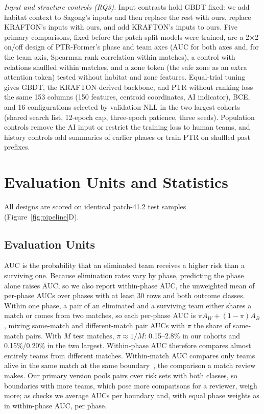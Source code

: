 \documentclass[sigconf,anonymous,nonacm]{acmart}
\begin{document}
\emph{Input and structure controls (RQ3).} Input contrasts hold GBDT fixed: we add habitat context to Sagong's inputs and then replace the rest with ours, replace KRAFTON's inputs with ours, and add KRAFTON's inputs to ours. Five primary comparisons, fixed before the patch-split models were trained, are a 2$\times$2 on/off design of PTR-Former's phase and team axes (AUC for both axes and, for the team axis, Spearman rank correlation within matches), a control with relations shuffled within matches, and a zone token (the safe zone as an extra attention token) tested without habitat and zone features. Equal-trial tuning~\cite{Bergstra12,Cawley10} gives GBDT, the KRAFTON-derived backbone, and PTR without ranking loss the same 153 columns (150 features, centroid coordinates, AI indicator), BCE, and 16 configurations selected by validation NLL in the two largest cohorts (shared search list, 12-epoch cap, three-epoch patience, three seeds). Population controls remove the AI input or restrict the training loss to human teams, and history controls add summaries of earlier phases or train PTR on shuffled past prefixes.

\section{Evaluation Units and Statistics}
\label{sec:method:evaluation}
All designs are scored on identical patch-41.2 test samples (Figure~\ref{fig:pipeline}D).

\subsection{Evaluation Units}
\label{sec:method:units}
AUC is the probability that an eliminated team receives a higher risk than a surviving one. Because elimination rates vary by phase, predicting the phase alone raises AUC, so we also report within-phase AUC, the unweighted mean of per-phase AUCs over phases with at least 30 rows and both outcome classes. Within one phase, a pair of an eliminated and a surviving team either shares a match or comes from two matches, so each per-phase AUC is $\pi A_W+(1-\pi)A_B$, mixing same-match and different-match pair AUCs with $\pi$ the share of same-match pairs. With $M$ test matches, $\pi\approx1/M$: 0.15--2.8\% in our cohorts and 0.15\%/0.20\% in the two largest. Within-phase AUC therefore compares almost entirely teams from different matches. Within-match AUC compares only teams alive in the same match at the same boundary~\cite{HeagertyZheng05,vanKlaveren14}, the comparison a match review makes. Our primary version pools pairs over risk sets with both classes, so boundaries with more teams, which pose more comparisons for a reviewer, weigh more; as checks we average AUCs per boundary and, with equal phase weights as in within-phase AUC, per phase.
\end{document}
